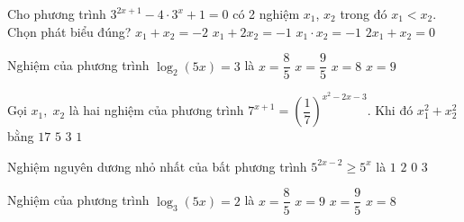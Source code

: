 \begin{ex}%
	 Cho phương trình $3^{2x+1}-4\cdot3^x+1=0$ có 2 nghiệm $x_1$, $x_2$ trong đó $x_1 < x_2$. Chọn phát biểu đúng?
	\choice 
		 {$x_1+x_2=-2$}
		{\True $x_1+2x_2=-1$} 
		 {$x_1\cdot x_2=-1$}
		{$2x_1+x_2=0$} 
\end{ex}

\begin{ex}%
	Nghiệm  của phương trình $\log_2\left(5x\right)=3$ là
	\choice 
		 {\True $x=\dfrac{8}{5}$}
		{$x=\dfrac{9}{5}$} 
		{$x=8$} 
		 {$x=9$}
\end{ex}

\begin{ex}%
	Gọi $x_1, \; x_2$ là hai nghiệm của phương trình $7^{x+1}=\left(\dfrac{1}{7} \right)^{x^2-2x-3}$. Khi  đó $x_1^2+x_2^2$ bằng
	 \choice
		{$17$} 
		{\True $5$} 
		 {$3$}
		{$1$} 
\end{ex}

\begin{ex}%
	Nghiệm nguyên dương nhỏ nhất của bất phương trình $5^{2x-2}\ge5^x$  là
	 \choice
		 {$1$}
		 {\True $2$}
		{$0$} 
		 {$3$}
\end{ex}

\begin{ex}%
	Nghiệm của phương trình ${\log  }_{3}(5x)=2$ là
	\choice 
		 {$x=\dfrac{8}{5}$}
		{$x=9$} 
		{\True $x=\dfrac{9}{5}$} 
		 {$x=8$}
\end{ex}

